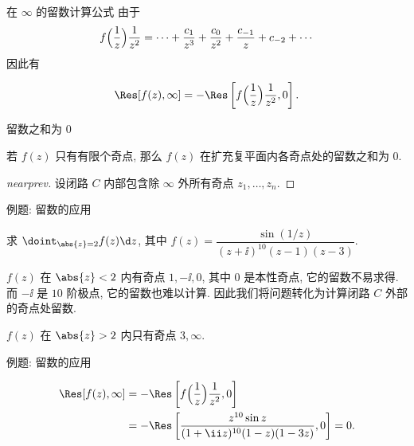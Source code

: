 \begin{frame}{在 $\infty$ 的留数计算公式}
	\onslide<+->
	由于
	\[
		f\Bigl(\frac1z\Bigr)\frac1{z^2}=\cdots+\frac{c_1}{z^3}+\frac{c_0}{z^2}+\frac{c_{-1}}z+c_{-2}+\cdots
	\]
	\onslide<+->
	因此有
	\begin{theorem*}[][极点留数计算公式 IV]
		\[
			\Res[f(z),\infty]=-\Res\left[f\Bigl(\frac1z\Bigr)\frac1{z^2},0\right].
		\]
	\end{theorem*}
\end{frame}


\begin{frame}{留数之和为 $0$}
	\onslide<+->
	\begin{theorem}[nearnext]
		若 $f(z)$ 只有有限个奇点, 那么 $f(z)$ 在扩充复平面内各奇点处的留数之和为 $0$.
	\end{theorem}
	\onslide<+->
	\begin{proof}[nearprev]
		设闭路 $C$ 内部包含除 $\infty$ 外所有奇点 $z_1,\dots,z_n$.
		\onslide<+->{%
			故 $\suml_{k=1}^n\Res[f(z),z_k]+\Res[f(z),\infty]=0$.\qedhere
		}
	\end{proof}
\end{frame}


\begin{frame}{例题: 留数的应用}
	\onslide<+->
	\begin{example}
		求 $\doint_{\abs{z}=2}f(z)\d z$, 其中 $f(z)=\dfrac{\sin(1/z)}{(z+\ii)^{10}(z-1)(z-3)}$.
	\end{example}
	\onslide<+->
	$f(z)$ 在 $\abs{z}<2$ 内有奇点 $1,-\ii ,0$,
	\onslide<+->
	其中 $0$ 是本性奇点, 它的留数不易求得.
	而 $-\ii $ 是 $10$ 阶极点, 它的留数也难以计算.
	\onslide<+->
	因此我们将问题转化为计算闭路 $C$ 外部的奇点处留数.
	\onslide<+->
	\begin{solution}
		$f(z)$ 在 $\abs{z}>2$ 内只有奇点 $3,\infty$.
		\onslide<+->{%
			\[
				\Res[f(z),3]=\lim_{z\to3}(z-3)f(z)=\frac1{2(3+\ii)^{10}}\sin\frac13.
			\]
		}\bigdel
	\end{solution}
\end{frame}


\begin{frame}{例题: 留数的应用}
	\onslide<+->
	\begin{solution}[][]
		\begin{align*}
			\Res[f(z),\infty]&=-\Res\left[f\Bigl(\frac1z\Bigr)\frac1{z^2},0\right]\\
			&=-\Res\left[\frac{z^{10}\sin z}{(1+\ii z)^{10}(1-z)(1-3z)},0\right]=0.
		\end{align*}
		\onslide<+->{%
			\begin{align*}
				\oint_{\abs{z}=2}f(z)\d z
				&=2\pi\ii\bigl[\Res[f(z),-\ii ]+\Res[f(z),1]+\Res[f(z),0]\bigr]\\
				&\visible<+->{=-2\pi\ii\bigl[\Res[f(z),3]+\Res[f(z),\infty]\bigr]=-\frac{\pi\ii}{(3+\ii)^{10}}\sin\frac13.}
			\end{align*}
		}
	\end{solution}
\end{frame}


